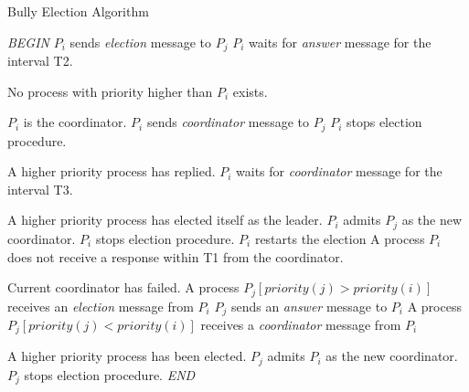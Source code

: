 \documentclass[dareport.tex]{subfiles}
\begin{document}
%



\clearpage

\begin{algorithm}[H]
	\small
	\caption{Bully Election Algorithm}
	\label{bully-algorithm}
	\begin{algorithmic}[1]
		\BState \emph{BEGIN}
			\State $P_{i}$ sends \emph{election} message to $P_{j}$
		\EndFor
		\State $P_{i}$ waits for \emph{answer} message for the interval T2.
		
		\Comment No process with priority higher than $P_{i}$ exists.
		
		\Comment $P_{i}$ is the coordinator.
				\State $P_{i}$ sends \emph{coordinator} message to $P_{j}$
			\EndFor
			\State $P_{i}$ stops election procedure.
		\Else
		
		\Comment A higher priority process has replied.
			\State $P_{i}$ waits for \emph{coordinator} message for the interval T3.
		
		\Comment A higher priority process has elected itself as the leader.
			\State $P_{i}$ admits $P_{j}$ as the new coordinator.
			\State $P_{i}$ stops election procedure.
		\Else
			\State {}
			\Comment $P_{i}$ restarts the election
		\EndIf
		\EndIf
		\EndProcedure
		\State A process $P_{i}$ does not receive a response within T1 from the coordinator.
		
		\Comment Current coordinator has failed.
		\State\indent {}
		\State A process $P_{j} \left[priority(j) > priority(i)\right]$ receives an \emph{election} message from $P_{i}$
		\State\indent $P_{j}$ sends an \emph{answer} message to $P_{i}$
		\State\indent {}
		\State A process $P_{j} \left[priority(j) < priority(i)\right]$ receives a \emph{coordinator} message from $P_{i}$
		
		\Comment A higher priority process has been elected.
		\State\indent $P_{j}$ admits $P_{i}$ as the new coordinator.
		\State\indent $P_{j}$ stops election procedure.
		\BState \emph{END}
	\end{algorithmic}
\end{algorithm}
\end{document}
